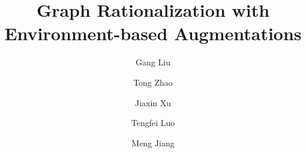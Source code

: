 \documentclass[sigconf]{acmart}
\begin{document}
\title{Graph Rationalization with Environment-based Augmentations} 



\author{Gang Liu} 

\author{Tong Zhao} 

\author{Jiaxin Xu} 

\author{Tengfei Luo} 

\author{Meng Jiang} 

\newcommand{\method}{\textsc{GREA}\xspace}

\newcommand{\unets}{\textsc{U-NetsPool}\xspace}
\newcommand{\selfattn}{\textsc{SelfAttnPool}\xspace}
\newcommand{\stablegnn}{\textsc{StableGNN}\xspace}
\newcommand{\oodgnn}{\textsc{OOD-GNN}\xspace}
\newcommand{\irm}{\textsc{IRM}\xspace}
\newcommand{\dir}{\textsc{DIR}\xspace}
\newcommand{\gcn}{\textsc{GCN}\xspace}
\newcommand{\gin}{\textsc{GIN}\xspace}

\newcommand{\dirplusaug}{\textsc{DIR}$+$\textsc{RepAug}\xspace}
\newcommand{\methodnoaug}{\textsc{GREA}$-$\textsc{RepAug}\xspace}

\newcommand{\overbar}[1]{\mkern 1.5mu\overline{\mkern-1.5mu#1\mkern-1.5mu}\mkern 1.5mu}

\newcommand{\glassTemp}{{GlassTemp}\xspace}
\newcommand{\meltTemp}{{MeltingTemp}\xspace}
\newcommand{\density}{{PolyDensity}\xspace}
\newcommand{\oxygen}{{O$_2$Perm}\xspace}

\newcommand{\hiv}{{ogbg-HIV}\xspace}
\newcommand{\toxcast}{{ogbg-ToxCast}\xspace}
\newcommand{\toxt}{{ogbg-Tox21}\xspace}
\newcommand{\bace}{{ogbg-BACE}\xspace}
\newcommand{\bbbp}{{ogbg-BBBP}\xspace}
\newcommand{\clintox}{{ogbg-ClinTox}\xspace}
\newcommand{\sider}{{ogbg-SIDER}\xspace}

\newcommand{\regreRSquare}{{R$^2$}\xspace}
\newcommand{\regreRMSE}{{RMSE}\xspace}
\newcommand{\classifyAUC}{{AUC}\xspace}
\end{document}
